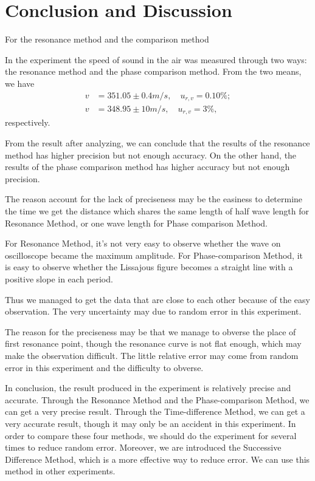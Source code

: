\section{Conclusion and Discussion}

For the resonance method and the comparison method
    
In the experiment 
the speed of sound in the air was measured through two ways: 
the resonance method and the phase comparison method. 
From the two means, we have 
    \begin{equation}
    \begin{split}
        v&=351.05\pm0.4 m/s,\quad u_{r,v}=0.10\%;\\
        v&=348.95\pm10 m/s,\quad u_{r,v}=3\%,
    \end{split}
    \end{equation}
    respectively. 

    From the result after analyzing, we can conclude that the results of the resonance method has higher precision but not enough accuracy.
    On the other hand, the results of the phase comparison method has higher accuracy but not enough precision.

The reason account for the lack of  preciseness may be the easiness to 
determine the time we get the distance which shares the same length of half wave length for Resonance Method, 
or one wave length for Phase comparison Method.

For Resonance Method, it's not very easy to observe whether the wave on oscilloscope became the maximum amplitude. 
For Phase-comparison Method, it is easy to observe whether the Lissajous figure becomes a straight line with a positive slope in each period. 

Thus we managed to get the data that are close to each other because of the easy observation. 
The very uncertainty may due to random error in this experiment.

The reason for the preciseness may be that we manage to obverse the place of first resonance point, though the resonance curve is not flat enough, which may make the observation difficult.
 The little relative error may come from random error in this experiment and the difficulty to obverse.

In conclusion, the result produced in the experiment is relatively precise and accurate. 
Through the Resonance Method and the Phase-comparison Method, we can get a very precise result. 
Through the Time-difference Method, we can get a very accurate result, though it may only be an accident in this experiment. In order to compare these four methods, we should do the experiment for several times to reduce random error.
Moreover, we are introduced the Successive Difference Method, which is a more effective way to reduce error. We can use this method in other experiments.

